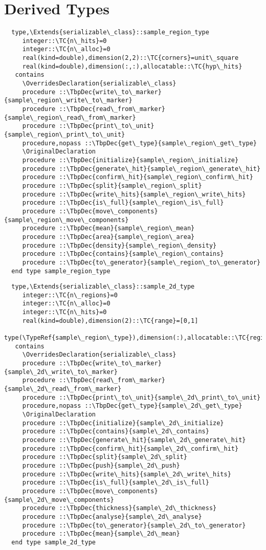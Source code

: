 \section{Derived Types}
\begin{Verbatim}
  type,\Extends{serializable\_class}::sample_region_type
     integer::\TC{n\_hits}=0
     integer::\TC{n\_alloc}=0
     real(kind=double),dimension(2,2)::\TC{corners}=unit\_square
     real(kind=double),dimension(:,:),allocatable::\TC{hyp\_hits}
   contains
     \OverridesDeclaration{serializable\_class}
     procedure ::\TbpDec{write\_to\_marker}{sample\_region\_write\_to\_marker}
     procedure ::\TbpDec{read\_from\_marker}{sample\_region\_read\_from\_marker}
     procedure ::\TbpDec{print\_to\_unit}{sample\_region\_print\_to\_unit}
     procedure,nopass ::\TbpDec{get\_type}{sample\_region\_get\_type}
     \OriginalDeclaration
     procedure ::\TbpDec{initialize}{sample\_region\_initialize}
     procedure ::\TbpDec{generate\_hit}{sample\_region\_generate\_hit}
     procedure ::\TbpDec{confirm\_hit}{sample\_region\_confirm\_hit}
     procedure ::\TbpDec{split}{sample\_region\_split}
     procedure ::\TbpDec{write\_hits}{sample\_region\_write\_hits}
     procedure ::\TbpDec{is\_full}{sample\_region\_is\_full}
     procedure ::\TbpDec{move\_components}{sample\_region\_move\_components}
     procedure ::\TbpDec{mean}{sample\_region\_mean}
     procedure ::\TbpDec{area}{sample\_region\_area}
     procedure ::\TbpDec{density}{sample\_region\_density}
     procedure ::\TbpDec{contains}{sample\_region\_contains}
     procedure ::\TbpDec{to\_generator}{sample\_region\_to\_generator}
  end type sample_region_type
\end{Verbatim}
\begin{Verbatim}
  type,\Extends{serializable\_class}::sample_2d_type
     integer::\TC{n\_regions}=0
     integer::\TC{n\_alloc}=0
     integer::\TC{n\_hits}=0
     real(kind=double),dimension(2)::\TC{range}=[0,1]
     type(\TypeRef{sample\_region\_type}),dimension(:),allocatable::\TC{regions}
   contains
     \OverridesDeclaration{serializable\_class}
     procedure ::\TbpDec{write\_to\_marker}{sample\_2d\_write\_to\_marker}
     procedure ::\TbpDec{read\_from\_marker}{sample\_2d\_read\_from\_marker}
     procedure ::\TbpDec{print\_to\_unit}{sample\_2d\_print\_to\_unit}
     procedure,nopass ::\TbpDec{get\_type}{sample\_2d\_get\_type}
     \OriginalDeclaration
     procedure ::\TbpDec{initialize}{sample\_2d\_initialize}
     procedure ::\TbpDec{contains}{sample\_2d\_contains}
     procedure ::\TbpDec{generate\_hit}{sample\_2d\_generate\_hit}
     procedure ::\TbpDec{confirm\_hit}{sample\_2d\_confirm\_hit}
     procedure ::\TbpDec{split}{sample\_2d\_split}
     procedure ::\TbpDec{push}{sample\_2d\_push}
     procedure ::\TbpDec{write\_hits}{sample\_2d\_write\_hits}
     procedure ::\TbpDec{is\_full}{sample\_2d\_is\_full}
     procedure ::\TbpDec{move\_components}{sample\_2d\_move\_components}
     procedure ::\TbpDec{thickness}{sample\_2d\_thickness}
     procedure ::\TbpDec{analyse}{sample\_2d\_analyse}
     procedure ::\TbpDec{to\_generator}{sample\_2d\_to\_generator}
     procedure ::\TbpDec{mean}{sample\_2d\_mean}
  end type sample_2d_type
\end{Verbatim}
